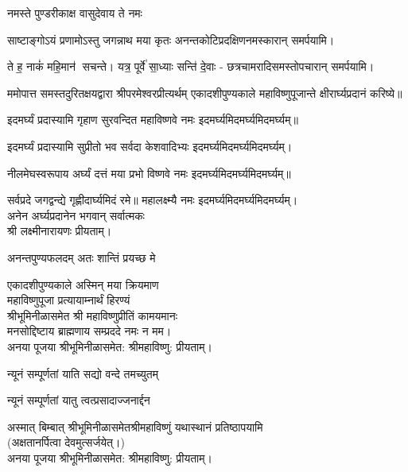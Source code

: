 \begin{center}
{नमस्ते पुण्डरीकाक्ष वासुदेवाय ते नमः}

{साष्टाङ्गोऽयं प्रणामोऽस्तु जगन्नाथ मया कृतः}
अनन्तकोटिप्रदक्षिणनमस्कारान् समर्पयामि।\medskip

{ते ह॒ नाकं॑ महि॒मान॑ सचन्ते। यत्र॒ पूर्वे॑ सा॒ध्याः सन्ति॑ दे॒वाः}
- छत्रचामरादिसमस्तोपचारान् समर्पयामि।\medskip

ममोपात्त समस्तदुरितक्षयद्वारा श्रीपरमेश्वरप्रीत्यर्थम् एकादशीपुण्यकाले  महाविष्णुपूजान्ते क्षीरार्घ्यप्रदानं करिष्ये॥
\medskip

{इदमर्घ्यं प्रदास्यामि गृहाण सुरवन्दित}
	महाविष्णवे नमः इदमर्घ्यमिदमर्घ्यमिदमर्घ्यम्॥\medskip

{इदमर्घ्यं प्रदास्यामि सुप्रीतो भव सर्वदा}
	केशवादिभ्यः इदमर्घ्यमिदमर्घ्यमिदमर्घ्यम्।\medskip

{नीलमेघस्वरूपाय अर्घ्यं दत्तं मया प्रभो}
	विष्णवे नमः इदमर्घ्यमिदमर्घ्यमिदमर्घ्यम्॥\medskip

{सर्वप्रदे जगद्वन्द्ये गृह्णीदार्घ्यमिदं रमे॥}
	महालक्ष्म्यै नमः इदमर्घ्यमिदमर्घ्यमिदमर्घ्यम्।\\
अनेन अर्घ्यप्रदानेन भगवान् सर्वात्मकः\\ श्री लक्ष्मीनारायणः प्रीयताम्।\medskip

{अनन्तपुण्यफलदम् अतः शान्तिं प्रयच्छ मे}

एकादशीपुण्यकाले अस्मिन् मया क्रियमाण\\
महाविष्णुपूजा प्रत्यायाम्नार्थं हिरण्यं\\
श्रीभूमिनीळासमेत श्री महाविष्णुप्रीतिं कामयमानः\\
मनसोद्दिष्टाय ब्राह्मणाय सम्प्रददे नमः न मम।\\ 
अनया पूजया श्रीभूमिनीळासमेत: श्रीमहाविष्णु: प्रीयताम्। 
 
{न्यूनं सम्पूर्णतां याति सद्यो वन्दे तमच्युतम्}

{न्यूनं सम्पूर्णतां यातु त्वत्प्रसादाज्जनार्द्दन}\medskip

अस्मात् बिम्बात् श्रीभूमिनीळासमेतश्रीमहाविष्णुं यथास्थानं प्रतिष्ठापयामि\\
(अक्षतानर्पित्वा देवमुत्सर्जयेत्।)\\
अनया पूजया श्रीभूमिनीळासमेत: श्रीमहाविष्णु: प्रीयताम्।\medskip


\end{center}
